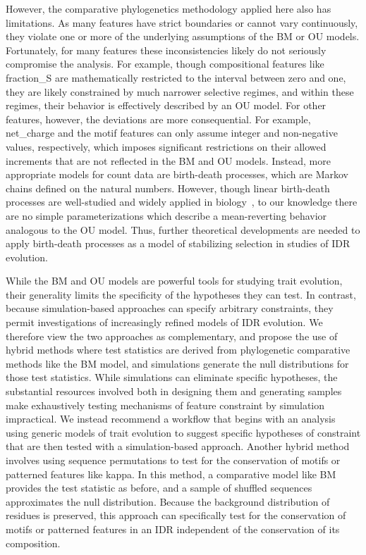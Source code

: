 However, the comparative phylogenetics methodology applied here also has limitations. As many features have strict boundaries or cannot vary continuously, they violate one or more of the underlying assumptions of the BM or OU models. Fortunately, for many features these inconsistencies likely do not seriously compromise the analysis. For example, though compositional features like fraction\_S are mathematically restricted to the interval between zero and one, they are likely constrained by much narrower selective regimes, and within these regimes, their behavior is effectively described by an OU model. For other features, however, the deviations are more consequential. For example, net\_charge and the motif features can only assume integer and non-negative values, respectively, which imposes significant restrictions on their allowed increments that are not reflected in the BM and OU models. Instead, more appropriate models for count data are birth-death processes, which are Markov chains defined on the natural numbers. However, though linear birth-death processes are well-studied and widely applied in biology~\cite{Crawford2011}, to our knowledge there are no simple parameterizations which describe a mean-reverting behavior analogous to the OU model. Thus, further theoretical developments are needed to apply birth-death processes as a model of stabilizing selection in studies of IDR evolution.

While the BM and OU models are powerful tools for studying trait evolution, their generality limits the specificity of the hypotheses they can test. In contrast, because simulation-based approaches can specify arbitrary constraints, they permit investigations of increasingly refined models of IDR evolution. We therefore view the two approaches as complementary, and propose the use of hybrid methods where test statistics are derived from phylogenetic comparative methods like the BM model, and simulations generate the null distributions for those test statistics. While simulations can eliminate specific hypotheses, the substantial resources involved both in designing them and generating samples make exhaustively testing mechanisms of feature constraint by simulation impractical. We instead recommend a workflow that begins with an analysis using generic models of trait evolution to suggest specific hypotheses of constraint that are then tested with a simulation-based approach. Another hybrid method involves using sequence permutations to test for the conservation of motifs or patterned features like kappa. In this method, a comparative model like BM provides the test statistic as before, and a sample of shuffled sequences approximates the null distribution. Because the background distribution of residues is preserved, this approach can specifically test for the conservation of motifs or patterned features in an IDR independent of the conservation of its composition.

